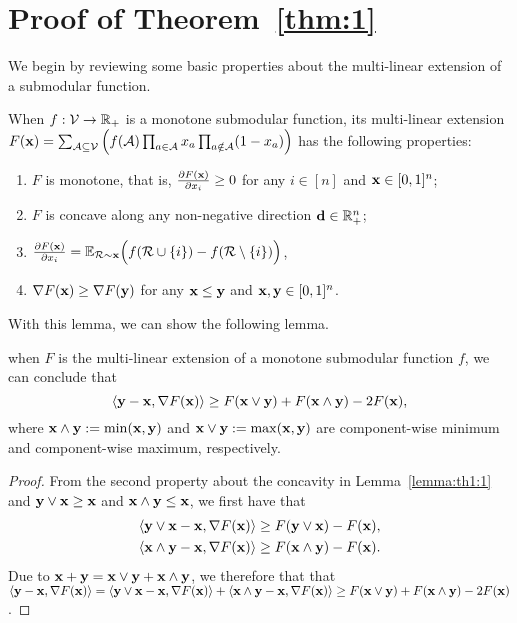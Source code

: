 \section{Proof of Theorem~\ref{thm:1}} \label{append:proof1}
	We begin by reviewing some basic properties about the multi-linear extension of a submodular function.
	\begin{lemma}\label{lemma:th1:1}When $f:\mathcal{V}\rightarrow\mathbb{R}_{+}$ is a monotone submodular function, its multi-linear extension $F(\mathbf{x})=\sum_{\mathcal{A}\subseteq\mathcal{V}}\Big(f(\mathcal{A})\prod_{a\in\mathcal{A}}x_{a}\prod_{a\notin\mathcal{A}}(1-x_{a})\Big)$ has the following properties:
	\begin{enumerate}
		\item  $F$ is monotone, that is, $\frac{\partial F(\mathbf{x})}{\partial x_{i}}\ge 0$ for any $i\in[n]$ and $\mathbf{x}\in[0,1]^{n}$;
		\item  $F$ is concave along any non-negative direction $\textbf{d}\in\mathbb{R}_{+}^{n}$;
		\item   $\frac{\partial F(\mathbf{x})}{\partial x_{i}}=\mathbb{E}_{\mathcal{R}\sim\mathbf{x}}\Big(f(\mathcal{R}\cup\{i\})-f(\mathcal{R}\setminus\{i\})\Big)$,
		\item  $\nabla F(\mathbf{x})\ge\nabla F(\mathbf{y})$ for any $\mathbf{x}\le\mathbf{y}$ and $\mathbf{x},\mathbf{y}\in[0,1]^{n}$.
	\end{enumerate}
	\end{lemma}
	With this lemma, we can show the following lemma.
	\begin{lemma}\label{lemma:thm1:2}when  $F$ is the multi-linear extension of a monotone submodular function $f$, we can conclude that
		\begin{equation*}
	  \langle\mathbf{y}-\mathbf{x},\nabla F(\mathbf{x})\rangle\ge F(\mathbf{x}\lor\mathbf{y})+F(\mathbf{x}\land\mathbf{y})-2F(\mathbf{x}),
		\end{equation*} where $\mathbf{x}\land\mathbf{y}:=\min(\mathbf{x},\mathbf{y})$ and $\mathbf{x}\lor\mathbf{y}:=\max(\mathbf{x},\mathbf{y})$ are component-wise minimum and component-wise maximum, respectively. 
	\end{lemma}
	\begin{proof}
	From the second property about the concavity in Lemma~\ref{lemma:th1:1} and $ \mathbf{y}\lor\mathbf{x}\ge\mathbf{x}$ and $\mathbf{x}\land \mathbf{y}\le\mathbf{x}$, we first have that
	\begin{equation}
	\begin{aligned}
	&\langle\mathbf{y}\lor \mathbf{x} -\mathbf{x}, \nabla F(\mathbf{x})\rangle \ge F(\mathbf{y}\lor \mathbf{x})-F(\mathbf{x}), \\
	&\langle \mathbf{x}\land \mathbf{y} -\mathbf{x}, \nabla F(\mathbf{x})\rangle \ge F(\mathbf{x}\land\mathbf{y})-F(\mathbf{x}).
	\end{aligned}
\end{equation}
Due to $\mathbf{x}+\mathbf{y}=\mathbf{x}\lor\mathbf{y}+\mathbf{x}\land\mathbf{y}$, we therefore that that $\langle\mathbf{y}-\mathbf{x},\nabla F(\mathbf{x})\rangle=\langle\mathbf{y}\lor \mathbf{x} -\mathbf{x}, \nabla F(\mathbf{x})\rangle +\langle \mathbf{x}\land \mathbf{y} -\mathbf{x}, \nabla F(\mathbf{x})\rangle\ge F(\mathbf{x}\lor\mathbf{y})+F(\mathbf{x}\land\mathbf{y})-2F(\mathbf{x})$.
\end{proof}
